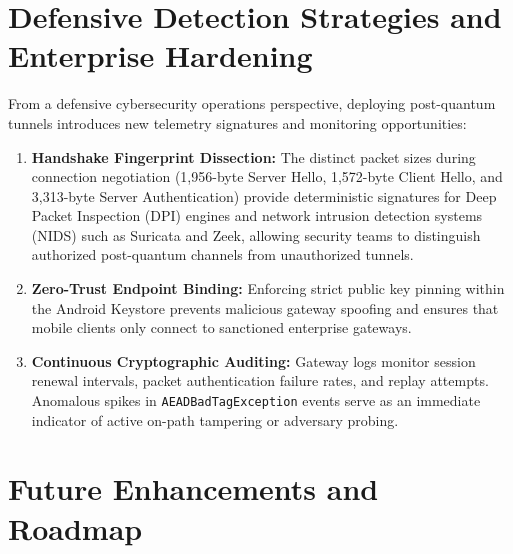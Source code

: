 \section{Defensive Detection Strategies and Enterprise Hardening}
\label{sec:defensive_strategies}

From a defensive cybersecurity operations perspective, deploying post-quantum tunnels introduces new telemetry signatures and monitoring opportunities:
\begin{enumerate}
    \item \textbf{Handshake Fingerprint Dissection:} The distinct packet sizes during connection negotiation (1,956-byte Server Hello, 1,572-byte Client Hello, and 3,313-byte Server Authentication) provide deterministic signatures for Deep Packet Inspection (DPI) engines and network intrusion detection systems (NIDS) such as Suricata and Zeek, allowing security teams to distinguish authorized post-quantum channels from unauthorized tunnels.
    \item \textbf{Zero-Trust Endpoint Binding:} Enforcing strict public key pinning within the Android Keystore prevents malicious gateway spoofing and ensures that mobile clients only connect to sanctioned enterprise gateways.
    \item \textbf{Continuous Cryptographic Auditing:} Gateway logs monitor session renewal intervals, packet authentication failure rates, and replay attempts. Anomalous spikes in \texttt{AEADBadTagException} events serve as an immediate indicator of active on-path tampering or adversary probing.
\end{enumerate}

\section{Future Enhancements and Roadmap}
\label{sec:future_scope}

